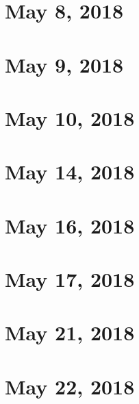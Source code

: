 \documentclass{article}
\begin{document}

\section{May 8, 2018}
\newpage


\section{May 9, 2018}
\newpage


\section{May 10, 2018}
\newpage


\section{May 14, 2018}
\newpage


\section{May 16, 2018}
\newpage


\section{May 17, 2018}
\newpage


\section{May 21, 2018}
\newpage


\section{May 22, 2018}
\newpage
\end{document}
